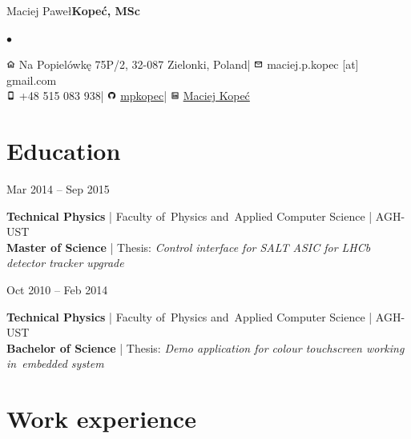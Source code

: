 \documentclass[11pt,a4paper,sans]{article}
\newcommand{\twhorline}[1]{\noindent\makebox[\linewidth]{\rule{\textwidth}{#1}}}
\newcommand{\cvedudateitem}[6]{
	
	\noindent
	\begin{minipage}[t]{0.22\linewidth}
		#1
	\end{minipage}
	\hfill
	\begin{minipage}[t]{0.76\linewidth}
		{\bfseries #2} | #3 | #4\\
		\textbf{#5} | Thesis: \emph{#6}
	\end{minipage}
	\vspace{1\baselineskip}

}
\newcommand{\firstname}{Maciej Paweł}
\newcommand{\familyname}{Kopeć}
\newcommand{\address}{Na Popielówkę 75P/2, 32-087 Zielonki, Poland}
\newcommand{\mobile}{+48 515 083 938}
\newcommand{\email}{maciej.p.kopec [at] gmail.com}
\newcommand{\github}{\href{https://github.com/mpkopec}{mpkopec}}
\newcommand{\linkedin}{\href{https://www.linkedin.com/in/maciej-kope\%C4\%87-46735595/}{Maciej Kopeć}}
\begin{document}
	\begin{center}
		{\Huge \firstname \space \bfseries \familyname \normalfont, MSc}
		\vspace{1\baselineskip}
		
		\large
		\renewcommand*{\do}[1]{$\bullet$ #1 }
		$\bullet$
		\vspace{0.2\baselineskip}
		\twhorline{1pt}
		
		\vspace{0.25\baselineskip}
		\includegraphics[height=0.8em]{img/icons8-home-96.png}
		\address \space |
		\includegraphics[height=0.8em]{img/icons8-envelope-96.png}
		\email \\
		
		\includegraphics[height=0.8em]{img/icons8-iphone-96.png}
		\mobile \space |
		\includegraphics[height=0.8em]{img/icons8-github-96.png}
		\github \space |
		\includegraphics[height=0.8em]{img/icons8-linkedin-96.png}
		\linkedin
		
		\twhorline{1pt}
		
	\end{center}
	
	\section{Education}	
	\cvedudateitem
		{Mar 2014 -- Sep 2015}
		{Technical Physics}
		{Faculty of~Physics and~Applied Computer Science}
		{AGH-UST}
		{Master of Science}
		{Control interface for SALT ASIC for LHCb detector tracker upgrade}
	\cvedudateitem
		{Oct 2010 -- Feb 2014}
		{Technical Physics}
		{Faculty of~Physics and~Applied Computer Science}
		{AGH-UST}
		{Bachelor of Science}
		{Demo application for colour touchscreen working in~embedded system}
		
	\section{Work experience}
\end{document}
